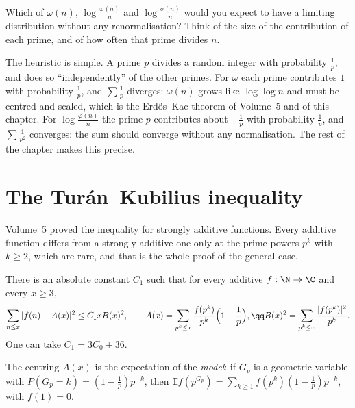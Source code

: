 \begin{think}
Which of $\omega(n)$, $\log\frac{\varphi(n)}n$ and $\log\frac{\sigma(n)}n$ would you expect to have a limiting distribution without any renormalisation? Think of the size of the contribution of each prime, and of how often that prime divides $n$.
\end{think}

The heuristic is simple. A prime $p$ divides a random integer with probability $\frac1p$, and does so ``independently'' of the other primes. For $\omega$ each prime contributes $1$ with probability $\frac1p$, and $\sum\frac1p$ diverges: $\omega(n)$ grows like $\log\log n$ and must be centred and scaled, which is the Erd\H{o}s--Kac theorem of Volume~5 and of this chapter. For $\log\frac{\varphi(n)}n$ the prime $p$ contributes about $-\frac1p$ with probability $\frac1p$, and $\sum\frac1{p^2}$ converges: the sum should converge without any normalisation. The rest of the chapter makes this precise.

\section{The Tur\'an--Kubilius inequality}

Volume~5 proved the inequality for strongly additive functions. Every additive function differs from a strongly additive one only at the prime powers $p^k$ with $k\ge2$, which are rare, and that is the whole proof of the general case.

\begin{theorem}\label{thm:tkgeneral}
There is an absolute constant $C_1$ such that for every additive $f:\N\to\C$ and every $x\ge3$,
\[
\sum_{n\le x}|f(n)-A(x)|^2\le C_1xB(x)^2,\qquad A(x)=\sum_{p^k\le x}\frac{f(p^k)}{p^k}\Bigl(1-\frac1p\Bigr),\qq B(x)^2=\sum_{p^k\le x}\frac{|f(p^k)|^2}{p^k}.
\]
One can take $C_1=3C_0+36$.
\end{theorem}

The centring $A(x)$ is the expectation of the \emph{model}: if $G_p$ is a geometric variable with $P(G_p=k)=(1-\frac1p)p^{-k}$, then $\mathbb E f(p^{G_p})=\sum_{k\ge1}f(p^k)(1-\frac1p)p^{-k}$, with $f(1)=0$.

